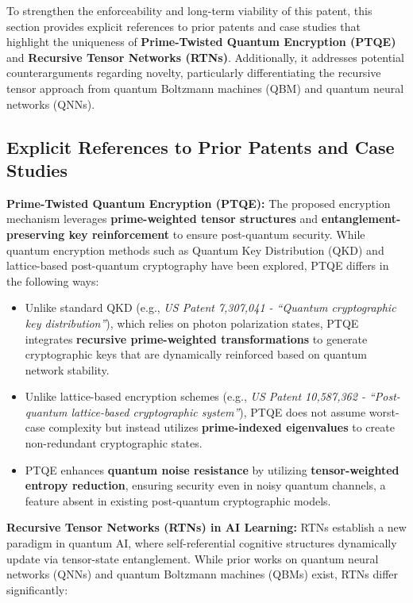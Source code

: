 \documentclass{article}
\theoremstyle{plain}
\begin{document}
\begin{itemize}
To strengthen the enforceability and long-term viability of this patent, this section provides explicit references to prior patents and case studies that highlight the uniqueness of \textbf{Prime-Twisted Quantum Encryption (PTQE)} and \textbf{Recursive Tensor Networks (RTNs)}. Additionally, it addresses potential counterarguments regarding novelty, particularly differentiating the recursive tensor approach from quantum Boltzmann machines (QBM) and quantum neural networks (QNNs).

\subsection{Explicit References to Prior Patents and Case Studies}

\noindent \textbf{Prime-Twisted Quantum Encryption (PTQE):}  
The proposed encryption mechanism leverages \textbf{prime-weighted tensor structures} and \textbf{entanglement-preserving key reinforcement} to ensure post-quantum security. While quantum encryption methods such as Quantum Key Distribution (QKD) and lattice-based post-quantum cryptography have been explored, PTQE differs in the following ways:

\begin{itemize}
    \item Unlike standard QKD (e.g., \textit{US Patent 7,307,041 - “Quantum cryptographic key distribution”}), which relies on photon polarization states, PTQE integrates \textbf{recursive prime-weighted transformations} to generate cryptographic keys that are dynamically reinforced based on quantum network stability.
    \item Unlike lattice-based encryption schemes (e.g., \textit{US Patent 10,587,362 - “Post-quantum lattice-based cryptographic system”}), PTQE does not assume worst-case complexity but instead utilizes \textbf{prime-indexed eigenvalues} to create non-redundant cryptographic states.
    \item PTQE enhances \textbf{quantum noise resistance} by utilizing \textbf{tensor-weighted entropy reduction}, ensuring security even in noisy quantum channels, a feature absent in existing post-quantum cryptographic models.
\end{itemize}

\noindent \textbf{Recursive Tensor Networks (RTNs) in AI Learning:}  
RTNs establish a new paradigm in quantum AI, where self-referential cognitive structures dynamically update via tensor-state entanglement. While prior works on quantum neural networks (QNNs) and quantum Boltzmann machines (QBMs) exist, RTNs differ significantly:


\end{itemize}
\end{document}
